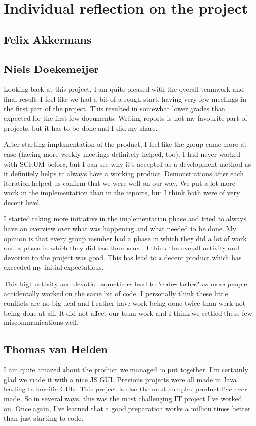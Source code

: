 \documentclass[a4paper]{article}
\begin{document}
\section{Individual reflection on the project} %
\subsection{Felix Akkermans}
\subsection{Niels Doekemeijer}
Looking back at this project, I am quite pleased with the overall teamwork and final result. I feel like we had a bit of a rough start, having very few meetings in the first part of the project. This resulted in somewhat lower grades than expected for the first few documents. Writing reports is not my favourite part of projects, but it has to be done and I did my share.

After starting implementation of the product, I feel like the group came more at ease (having more weekly meetings definitely helped, too). I had never worked with SCRUM before, but I can see why it's accepted as a development method as it definitely helps to always have a working product. Demonstrations after each iteration helped us confirm that we were well on our way. We put a lot more work in the implementation than in the reports, but I think both were of very decent level.

I started taking more initiative in the implementation phase and tried to always have an overview over what was happening and what needed to be done. My opinion is that every group member had a phase in which they did a lot of work and a phase in which they did less than usual. I think the overall activity and devotion to the project was good. This has lead to a decent product which has exceeded my initial expectations.

This high activity and devotion sometimes lead to "code-clashes" as more people accidentally worked on the same bit of code. I personally think these little conflicts are no big deal and I rather have work being done twice than work not being done at all. It did not affect our team work and I think we settled these few miscommunications well.

\subsection{Thomas van Helden}
I am quite amazed about the product we managed to put together. I'm certainly glad we made it with a nice JS GUI. Previous projects were all made in Java leading to horrific GUIs. This project is also the most complex product I've ever made. So in several ways, this was the most challenging IT project I've worked on. Once again, I've learned that a good preparation works a million times better than just starting to code. 
\end{document}
